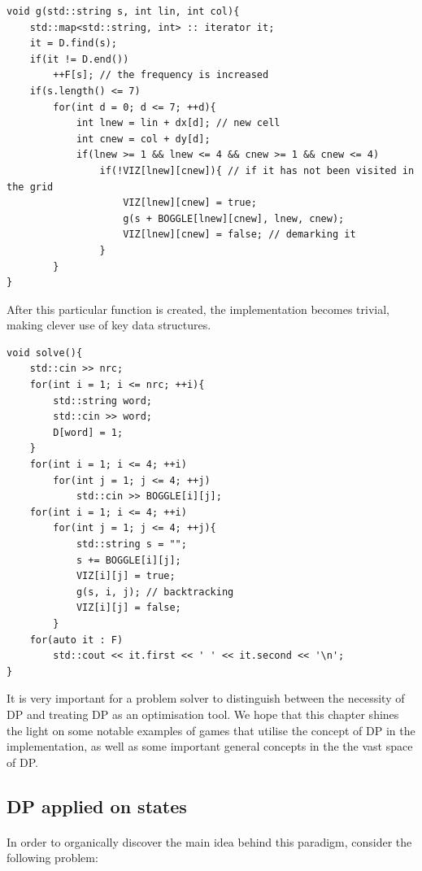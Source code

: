 \documentclass[letterpaper]{article}
\begin{document}
\begin{lstlisting}
void g(std::string s, int lin, int col){
    std::map<std::string, int> :: iterator it;
    it = D.find(s);
    if(it != D.end())
        ++F[s]; // the frequency is increased
    if(s.length() <= 7)
        for(int d = 0; d <= 7; ++d){
            int lnew = lin + dx[d]; // new cell
            int cnew = col + dy[d];
            if(lnew >= 1 && lnew <= 4 && cnew >= 1 && cnew <= 4)
                if(!VIZ[lnew][cnew]){ // if it has not been visited in the grid
                    VIZ[lnew][cnew] = true;
                    g(s + BOGGLE[lnew][cnew], lnew, cnew);
                    VIZ[lnew][cnew] = false; // demarking it
                }
        }
}
\end{lstlisting}

After this particular function is created, the implementation becomes trivial, making clever use of key data structures.

\begin{lstlisting}
void solve(){
    std::cin >> nrc;
    for(int i = 1; i <= nrc; ++i){
        std::string word;
        std::cin >> word;
        D[word] = 1;
    }
    for(int i = 1; i <= 4; ++i)
        for(int j = 1; j <= 4; ++j)
            std::cin >> BOGGLE[i][j];
    for(int i = 1; i <= 4; ++i)
        for(int j = 1; j <= 4; ++j){
            std::string s = "";
            s += BOGGLE[i][j];
            VIZ[i][j] = true;
            g(s, i, j); // backtracking
            VIZ[i][j] = false;
        }
    for(auto it : F)
        std::cout << it.first << ' ' << it.second << '\n';
}
\end{lstlisting}

It is very important for a problem solver to distinguish between the necessity of DP and treating DP as an optimisation tool. We hope that this chapter shines the light on some notable examples of games that utilise the concept of DP in the implementation, as well as some important general concepts in the the vast space of DP.

\newpage

\subsection{DP applied on states}

\paragraph{}

In order to organically discover the main idea behind this paradigm, consider the following problem:
\end{document}
